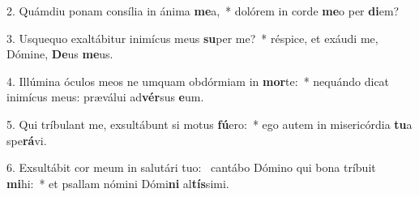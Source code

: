 2. Quámdiu ponam consília in ánima \textbf{me}a,~*  dolórem in corde \textbf{me}o per \textbf{di}em?\

3. Usquequo exaltábitur inimícus meus \textbf{su}per me?~*  réspice, et exáudi me, Dómine, \textbf{De}us \textbf{me}us.\

4. Illúmina óculos meos ne umquam obdórmiam in \textbf{mor}te:~*  nequándo dicat inimícus meus: præválui ad\textbf{vér}sus \textbf{e}um.\

5. Qui tríbulant me, exsultábunt si motus \textbf{fú}ero:~*  ego autem in misericórdia \textbf{tu}a spe\textbf{rá}vi.\

6. Exsultábit cor meum in salutári tuo: \dag\  cantábo Dómino qui bona tríbuit \textbf{mi}hi:~*  et psallam nómini Dómi\textbf{ni} al\textbf{tís}simi.\

